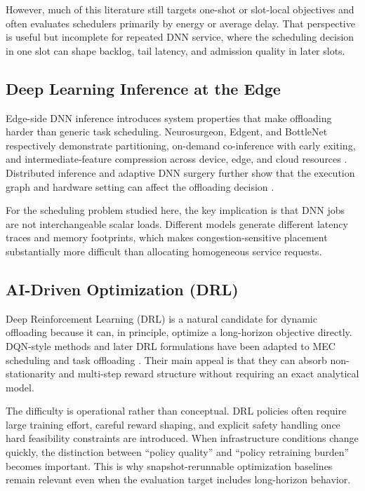 \documentclass[pdflatex,sn-mathphys-num]{sn-jnl}
\begin{document}
However, much of this literature still targets one-shot or slot-local objectives and often evaluates schedulers primarily by energy or average delay. That perspective is useful but incomplete for repeated DNN service, where the scheduling decision in one slot can shape backlog, tail latency, and admission quality in later slots.

\subsection{Deep Learning Inference at the Edge}
Edge-side DNN inference introduces system properties that make offloading harder than generic task scheduling. Neurosurgeon, Edgent, and BottleNet respectively demonstrate partitioning, on-demand co-inference with early exiting, and intermediate-feature compression across device, edge, and cloud resources \cite{Kang2017, Li2018, Eshratifar2019}. Distributed inference and adaptive DNN surgery further show that the execution graph and hardware setting can affect the offloading decision \cite{Teerapittayanon2017, Hu2019DNNsurgery}.

For the scheduling problem studied here, the key implication is that DNN jobs are not interchangeable scalar loads. Different models generate different latency traces and memory footprints, which makes congestion-sensitive placement substantially more difficult than allocating homogeneous service requests.

\subsection{AI-Driven Optimization (DRL)}
Deep Reinforcement Learning (DRL) is a natural candidate for dynamic offloading because it can, in principle, optimize a long-horizon objective directly. DQN-style methods \cite{Mnih2015} and later DRL formulations have been adapted to MEC scheduling and task offloading \cite{Huang2020, Tang2022}. Their main appeal is that they can absorb non-stationarity and multi-step reward structure without requiring an exact analytical model.

The difficulty is operational rather than conceptual. DRL policies often require large training effort, careful reward shaping, and explicit safety handling once hard feasibility constraints are introduced. When infrastructure conditions change quickly, the distinction between ``policy quality'' and ``policy retraining burden'' becomes important. This is why snapshot-rerunnable optimization baselines remain relevant even when the evaluation target includes long-horizon behavior.
\end{document}
